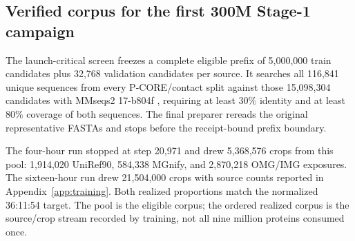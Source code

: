 \documentclass{article}
\begin{document}
\subsection{Verified corpus for the first 300M Stage-1 campaign}

The launch-critical screen freezes a complete eligible prefix of 5,000,000
train candidates plus 32,768 validation candidates per source. It searches
all 116,841 unique sequences from every P-CORE/contact split against those
15,098,304 candidates with MMseqs2 17-b804f
\citep{steinegger2017mmseqs2}, requiring at least 30\% identity and at least 80\%
coverage of both sequences. The final preparer rereads the original
representative FASTAs and stops before the receipt-bound prefix boundary.

\begin{table}[H]
  \centering
  \scriptsize
  \setlength{\tabcolsep}{3.0pt}
  \caption{Actual materialized first-campaign pool. Rejections apply only to the original-source prefixes scanned before all targets were filled; the homology search found 1,592,566 unique exclusions across the larger screened prefixes. Protein and residue counts are explicitly separated.}
  \label{tab:first-corpus}
\end{table}

The four-hour run stopped at step 20,971 and drew 5,368,576 crops from this
pool: 1,914,020 UniRef90, 584,338 MGnify, and 2,870,218 OMG/IMG exposures. The
sixteen-hour run drew 21,504,000 crops with source counts reported in
Appendix~\ref{app:training}. Both realized proportions match the normalized
36:11:54 target. The pool is the eligible corpus; the ordered realized corpus
is the source/crop stream recorded by training, not all nine million proteins
consumed once.
\end{document}
